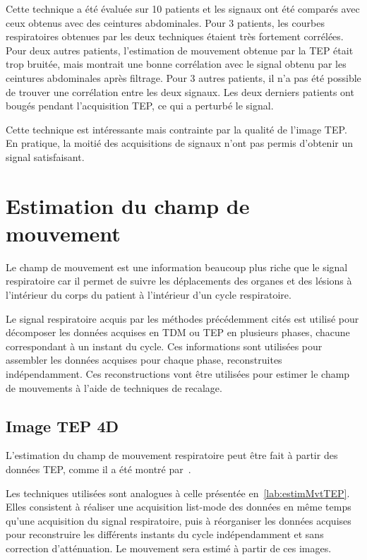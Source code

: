 Cette technique a été évaluée sur 10 patients et les signaux ont été comparés avec ceux obtenus avec des ceintures abdominales. Pour 3 patients, les courbes respiratoires obtenues par les deux techniques étaient très fortement corrélées. Pour deux autres patients, l'estimation de mouvement obtenue par la TEP était trop bruitée, mais montrait une bonne corrélation avec le signal obtenu par les ceintures abdominales après filtrage. Pour 3 autres patients, il n'a pas été possible de trouver une corrélation entre les deux signaux. Les deux derniers patients ont bougés pendant l'acquisition TEP, ce qui a perturbé le signal.

Cette technique est intéressante mais contrainte par la qualité de l'image TEP. En pratique, la moitié des acquisitions de signaux n'ont pas permis d'obtenir un signal satisfaisant.


\section{Estimation du champ de mouvement}
\label{lab:estimChamp}
Le champ de mouvement est une information beaucoup plus riche que le signal respiratoire car il permet de suivre les déplacements des organes et des lésions à l'intérieur du corps du patient à l'intérieur d'un cycle respiratoire.

Le signal respiratoire acquis par les méthodes précédemment cités est utilisé pour décomposer les données acquises en TDM ou TEP en plusieurs phases, chacune correspondant à un instant du cycle. Ces informations sont utilisées pour assembler les données acquises pour chaque phase, reconstruites indépendamment. Ces reconstructions vont être utilisées pour estimer le champ de mouvements à l'aide de techniques de recalage.


\subsection{Image TEP 4D}
\label{lab:estimMvtTEP4D}
L'estimation du champ de mouvement respiratoire peut être fait à partir des données TEP, comme il a été montré par~\cite{dawood2008respiratory, dawood2006lung}. 

Les techniques utilisées sont analogues à celle présentée en~\ref{lab:estimMvtTEP}. Elles consistent à réaliser une acquisition list-mode des données en même temps qu'une acquisition du signal respiratoire, puis à réorganiser les données acquises pour reconstruire les différents instants du cycle indépendamment et sans correction d'atténuation. Le mouvement sera estimé à partir de ces images.


